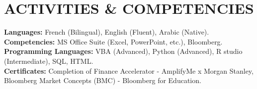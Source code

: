 \documentclass[letterpaper,11pt]{article}
\begin{document}
\section{ACTIVITIES \& COMPETENCIES}
\begin{itemize}[leftmargin=0.15in , label={}]
    \small{\item{
     \textbf{Languages:} French (Bilingual), English (Fluent), Arabic (Native). \\
     \vspace{5pt}
     \textbf{Competencies:} MS Office Suite (Excel, PowerPoint, etc.), Bloomberg. \\
     \vspace{5pt}
     \textbf{Programming Languages:} VBA (Advanced), Python (Advanced), R studio (Intermediate), SQL, HTML. \\
     \vspace{5pt}
     \textbf{Certificates:} Completion of Finance Accelerator - AmplifyMe x Morgan Stanley, Bloomberg Market Concepts (BMC) - Bloomberg for Education.
    }}
\end{itemize}
\end{document}
